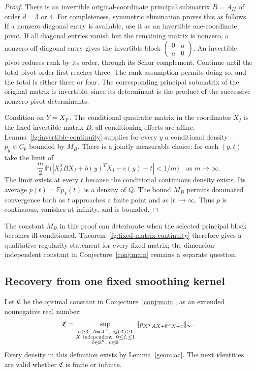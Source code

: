 \begin{proof}
There is an invertible original-coordinate principal
submatrix $B=A_{II}$ of order $d=3$ or $4$.
For completeness, symmetric elimination proves this as
follows.  If a nonzero diagonal entry is available, use it
as an invertible one-coordinate pivot.  If all diagonal
entries vanish but the remaining matrix is nonzero, a
nonzero off-diagonal entry gives the invertible block
$\left(\begin{smallmatrix}0&a\\a&0\end{smallmatrix}\right)$.
An invertible pivot reduces rank by its order, through its
Schur complement.  Continue until the total pivot order
first reaches three.  The rank assumption permits doing
so, and the total is either three or four.
The corresponding principal submatrix of the original
matrix is invertible, since its determinant is the product
of the successive nonzero pivot determinants.

Condition on $Y=X_{I^c}$.  The conditional quadratic matrix
in the coordinates $X_I$ is the fixed invertible matrix
$B$; all conditioning effects are affine.
Lemma~\ref{fg:invertible-continuity} supplies for every $y$
a conditional density $p_y\in C_0$ bounded by $M_B$.
There is a jointly measurable choice: for each $(y,t)$
take the limit of
\[
 \frac{m}{2}\,
 \mathbb P\bigl(|X_I^TBX_I+b(y)^TX_I+c(y)-t|<1/m\bigr)
 \quad\text{as }m\to\infty.
\]
The limit exists at every $t$ because the conditional
continuous density exists.
Its average $p(t)=\mathbb E p_Y(t)$ is a density of $Q$.
The bound $M_B$ permits dominated convergence both as
$t$ approaches a finite point and as $|t|\to\infty$.
Thus $p$ is continuous, vanishes at infinity, and is bounded.
\end{proof}

\begin{remark}
The constant $M_B$ in this proof can deteriorate when the
selected principal block becomes ill-conditioned.
Theorem~\ref{fg:fixed-matrix-continuity} therefore gives a
qualitative regularity statement for every fixed matrix;
the dimension-independent constant in
Conjecture~\ref{conj:main} remains a separate question.
\end{remark}

\subsection{Recovery from one fixed smoothing kernel}

Let $\mathfrak C$ be the optimal constant in Conjecture~\ref{conj:main},
as an extended nonnegative real number:
\[
 \mathfrak C
 =\sup_{\substack{n\geq3,\ A=A^T,\ s_3(A)\geq1\\
                  X\ {\rm independent},\ 0\leq f_i\leq1\\
                  b\in\mathbb R^n,\ c\in\mathbb R}}
       \|p_{X^TAX+b^TX+c}\|_\infty .
\]
Every density in this definition exists by
Lemma~\ref{geom:ac}.  The next identities are valid whether
$\mathfrak C$ is finite or infinite.


